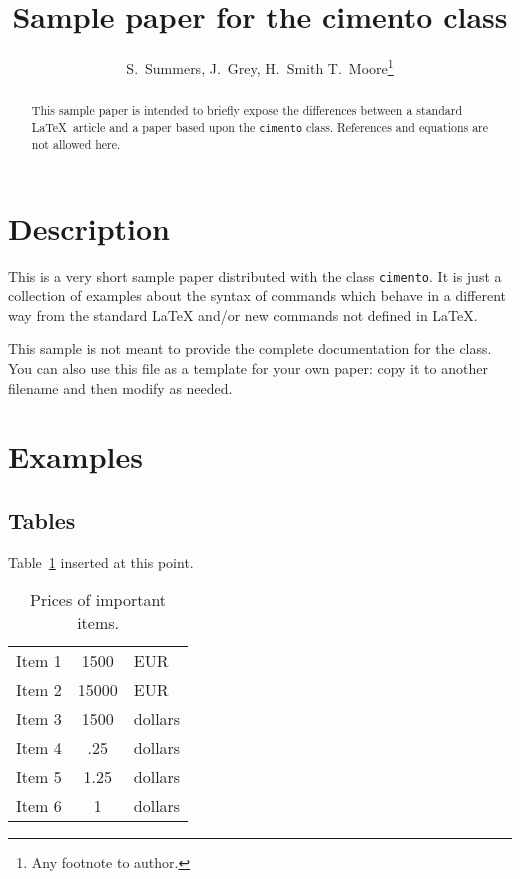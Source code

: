 \documentclass{cimento}
\title{Sample paper for the cimento class}
\author{S.~Summers\from{ins:x}\ETC,
J.~Grey\from{ins:x},
H.~Smith\from{ins:x}
        \atque
T.~Moore\from{ins:y}\thanks{Any footnote to author.}}
\begin{document}
\maketitle

\begin{abstract}
This sample paper is intended to briefly expose the differences
between a standard \LaTeX\ article and a paper based upon the
\texttt{cimento} class. References and equations are not allowed here. 
\end{abstract}

\section{Description}
This is a very short sample paper distributed with the class
\texttt{cimento}.
It is just a collection of examples about the syntax of commands
which behave in a different way from the standard \LaTeX
and/or new commands not defined in \LaTeX.




This sample is not meant to provide the complete documentation for the class.
You can also use this file as a template for your own paper:
copy it to another filename and then modify as needed.

\section{Examples}

\subsection{Tables}
Table~\ref{tab:pricesI}
inserted at this point.

\begin{table}
  \caption{Prices of important items.}
  \label{tab:pricesI}
  \begin{tabular}{rcl}
    \hline
      Item 1      & 1500  & EUR    \\
      Item 2 & 15000 & EUR    \\
      Item 3      & 1500  & dollars \\
    \hline
      Item 4     & .25   & dollars \\
      Item 5         & 1.25  & dollars \\
      Item 6         & 1     & dollars \\
    \hline
  \end{tabular}
\end{table}
\end{document}
